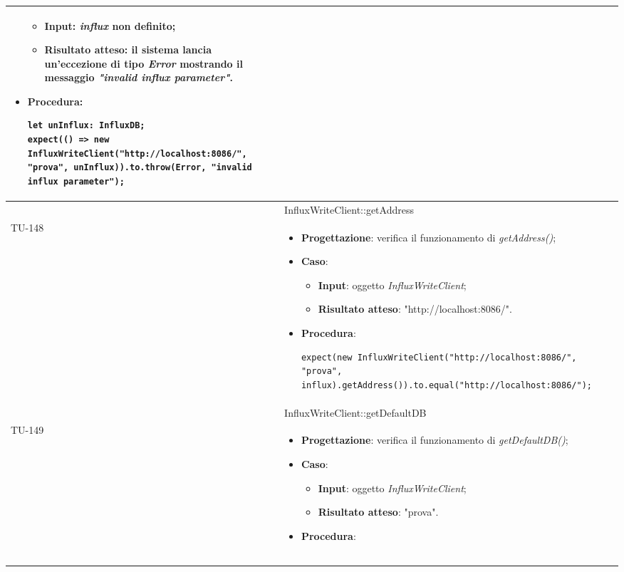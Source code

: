 \begin{longtable}{|C{1.5cm}|C{14.5cm}|}
\begin{itemize}
\begin{itemize}
		\item \textbf{Input}: \emph{influx} non definito;
		\item \textbf{Risultato atteso}: il sistema lancia un'eccezione di tipo \emph{Error} mostrando il messaggio \emph{"invalid influx parameter"}.
	\end{itemize}
	\item \textbf{Procedura}:
	\begin{lstlisting}
let unInflux: InfluxDB;
expect(() => new InfluxWriteClient("http://localhost:8086/", "prova", unInflux)).to.throw(Error, "invalid influx parameter");
	\end{lstlisting}
\end{itemize}\\
\hline
{} & InfluxWriteClient::getAddress
\\ \hline
{TU-148} &
\begin{itemize}
	\item \textbf{Progettazione}: verifica il funzionamento di \emph{getAddress()};
	\item \textbf{Caso}: 
	\begin{itemize}
		\item \textbf{Input}: oggetto \emph{InfluxWriteClient};
		\item \textbf{Risultato atteso}: "http://localhost:8086/".
	\end{itemize}
	\item \textbf{Procedura}:
	\begin{lstlisting}
expect(new InfluxWriteClient("http://localhost:8086/", "prova", influx).getAddress()).to.equal("http://localhost:8086/");
	\end{lstlisting}
\end{itemize}\\
\hline
{} & InfluxWriteClient::getDefaultDB
\\ \hline
{TU-149} &
\begin{itemize}
	\item \textbf{Progettazione}: verifica il funzionamento di \emph{getDefaultDB()};
	\item \textbf{Caso}: 
	\begin{itemize}
		\item \textbf{Input}: oggetto \emph{InfluxWriteClient};
		\item \textbf{Risultato atteso}: "prova".
	\end{itemize}
	\item \textbf{Procedura}:
	\begin{lstlisting}

\end{lstlisting}
\end{itemize}
\end{longtable}
